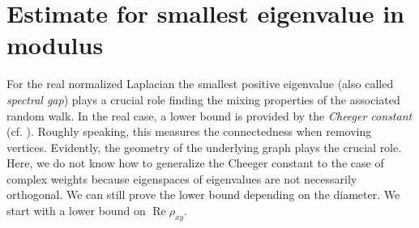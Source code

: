 \documentclass[a4paper,11pt]{amsart}
\theoremstyle{definition}
\renewcommand{\Re}{\operatorname{Re}}%
\begin{document}
\section{Estimate for smallest eigenvalue in modulus}
\label{section:SmallestEigenvalue}
For the real normalized Laplacian the smallest positive eigenvalue (also called \emph{spectral gap}) plays a crucial role finding the mixing properties of the associated random walk. In the real case, a lower bound is provided by the \emph{Cheeger constant} (cf. \cite{Chung}). Roughly speaking, this measures the connectedness when removing vertices. Evidently, the geometry of the underlying graph plays the crucial role. Here, we do not know how to generalize the Cheeger constant to the case of complex weights because eigenspaces of eigenvalues are not necessarily orthogonal. We can still prove the lower bound depending on the diameter. We start with a lower bound on $\Re \rho_{xy}$.
\end{document}
